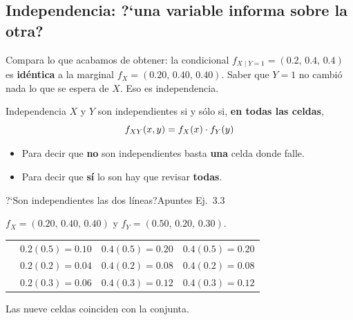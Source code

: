 \subsection{Independencia: ?`una variable informa sobre la otra?}

Compara lo que acabamos de obtener: la condicional $f_{X\mid Y=1}=(0.2,\,0.4,\,0.4)$ es \textbf{id\'entica} a la marginal
$f_X=(0.20,\,0.40,\,0.40)$. Saber que $Y=1$ no cambi\'o nada lo que se espera de $X$. Eso es independencia.

\begin{idea}{Independencia}
$X$ y $Y$ son independientes si y s\'olo si, \textbf{en todas las celdas},
\[f_{XY}(x,y)=f_X(x)\cdot f_Y(y)\]
\begin{itemize}
\item Para decir que \textbf{no} son independientes basta \textbf{una} celda donde falle.
\item Para decir que \textbf{s\'i} lo son hay que revisar \textbf{todas}.
\end{itemize}
\end{idea}

\begin{resuelto}{?`Son independientes las dos l\'ineas?}{Apuntes \textbullet{} Ej.~3.3}
\begin{pasos}
$f_X=(0.20,\,0.40,\,0.40)$ y $f_Y=(0.50,\,0.20,\,0.30)$.
\begin{center}\small
\begin{tabular}{|C|D|D|D|}\hline
{} &  &  & \\\hline
{} & $0.2(0.5)=0.10$ & $0.4(0.5)=0.20$ & $0.4(0.5)=0.20$\\\hline
{} & $0.2(0.2)=0.04$ & $0.4(0.2)=0.08$ & $0.4(0.2)=0.08$\\\hline
{} & $0.2(0.3)=0.06$ & $0.4(0.3)=0.12$ & $0.4(0.3)=0.12$\\\hline
\end{tabular}
\end{center}
Las nueve celdas coinciden con la conjunta. 
\end{pasos}
\end{resuelto}

